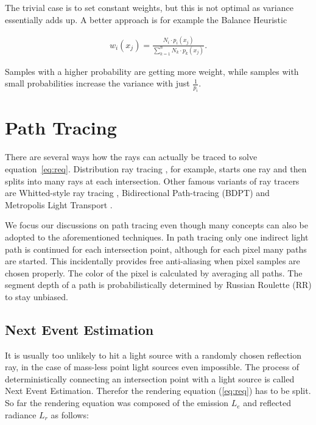 The trivial case is to set constant weights, but this is not optimal as variance essentially adds up. A better approach is for example the Balance Heuristic

\begin{align}
w_i(x_j) = \frac{N_i \cdot p_i(x_j)}{\sum_{k=1}^{n} N_k \cdot p_k(x_j)}.
\label{eq:powerheuristic}
\end{align}

Samples with a higher probability are getting more weight, while samples with small probabilities increase the variance with just $\frac{1}{p_i}$.

\section{Path Tracing}

There are several ways how the rays can actually be traced to solve equation~\ref{eq:req}. Distribution ray tracing \parencite{DBLP:conf/siggraph/CookPC84}, for example, starts one ray and then splits into many rays at each intersection. Other famous variants of ray tracers are Whitted-style ray tracing \parencite{DBLP:journals/cacm/Whitted80}, Bidirectional Path-tracing (BDPT) \parencite{DBLP:conf/rt/LafortuneW96} and Metropolis Light Transport \parencite{DBLP:conf/siggraph/VeachG97}.

We focus our discussions on path tracing even though many concepts can also be adopted to the aforementioned techniques. In path tracing only one indirect light path is continued for each intersection point, although for each pixel many paths are started. This incidentally provides free anti-aliasing when pixel samples are chosen properly. The color of the pixel is calculated by averaging all paths. The segment depth of a path is probabilistically determined by Russian Roulette (RR) to stay unbiased.

\subsection{Next Event Estimation}
\label{sec:NEE}

It is usually too unlikely to hit a light source with a randomly chosen reflection ray, in the case of mass-less point light sources even impossible. The process of deterministically connecting an intersection point with a light source is called Next Event Estimation. Therefor the rendering equation (\ref{eq:req}) has to be split. So far the rendering equation was composed of the emission $L_e$ and reflected radiance $L_r$ as follows:

